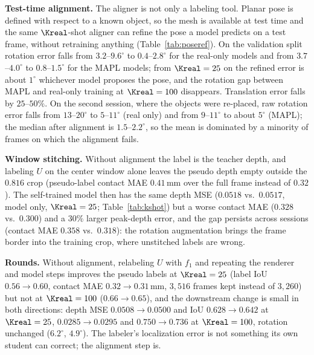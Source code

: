 \noindent\textbf{Test-time alignment.} The aligner is not only a labeling tool. Planar pose is defined with respect to a known object, so the mesh is available at test time and the same $\Kreal$-shot aligner can refine the pose a model predicts on a test frame, without retraining anything (Table~\ref{tab:poseref}). On the validation split rotation error falls from $3.2$--$9.6^\circ$ to $0.4$--$2.8^\circ$ for the real-only models and from $3.7$--$4.0^\circ$ to $0.8$--$1.5^\circ$ for the MAPL models; from $\Kreal=25$ on the refined error is about $1^\circ$ whichever model proposes the pose, and the rotation gap between MAPL and real-only training at $\Kreal=100$ disappears. Translation error falls by $25$--$50\%$. On the second session, where the objects were re-placed, raw rotation error falls from $13$--$20^\circ$ to $5$--$11^\circ$ (real only) and from $9$--$11^\circ$ to about $5^\circ$ (MAPL); the median after alignment is $1.5$--$2.2^\circ$, so the mean is dominated by a minority of frames on which the alignment fails.

\noindent\textbf{Window stitching.} Without alignment the label is the teacher depth, and labeling $U$ on the center window alone leaves the pseudo depth empty outside the $0.816$ crop (pseudo-label contact MAE $0.41\,$mm over the full frame instead of $0.32$). The self-trained model then has the same depth MSE ($0.0518$ vs.\ $0.0517$, model only, $\Kreal=25$; Table~\ref{tab:kshot}) but a worse contact MAE ($0.328$ vs.\ $0.300$) and a $30\%$ larger peak-depth error, and the gap persists across sessions (contact MAE $0.358$ vs.\ $0.318$): the rotation augmentation brings the frame border into the training crop, where unstitched labels are wrong.

\noindent\textbf{Rounds.} Without alignment, relabeling $U$ with $f_1$ and repeating the renderer and model steps improves the pseudo labels at $\Kreal=25$ (label IoU $0.56\!\to\!0.60$, contact MAE $0.32\!\to\!0.31\,$mm, $3{,}516$ frames kept instead of $3{,}260$) but not at $\Kreal=100$ ($0.66\!\to\!0.65$), and the downstream change is small in both directions: depth MSE $0.0508\!\to\!0.0500$ and IoU $0.628\!\to\!0.642$ at $\Kreal=25$, $0.0285\!\to\!0.0295$ and $0.750\!\to\!0.736$ at $\Kreal=100$, rotation unchanged ($6.2^\circ$, $4.9^\circ$). The labeler's localization error is not something its own student can correct; the alignment step is.

